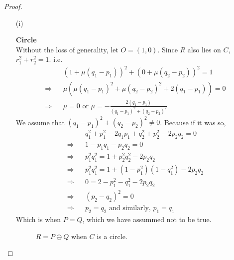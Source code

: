 \begin{proof}
  \begin{itemize}
    \item[(i)]{\textbf{Circle}\\
        Without the loss of generality, let $O=(1,0)$. Since $R$ also lies on $C$, $r_1^2+r_2^2=1$. i.e.
        \begin{eqnarray*}
          &&(1+\mu(q_1-p_1))^2+(0+\mu(q_2-p_2))^2=1\\
          \Rightarrow && \mu(\mu(q_1-p_1)^2+\mu(q_2-p_2)^2+2(q_1-p_1))=0\\
          \Rightarrow && \mu=0\text{ or }\mu=-\frac{2(q_1-p_1)}{(q_1-p_1)^2+(q_2-p_2)^2}
        \end{eqnarray*}
        We assume that $(q_1-p_1)^2+(q_2-p_2)^2\not=0$. Because if it was so,
        \begin{eqnarray*}
          &&q_1^2+p_1^2-2q_1p_1+q_2^2+p_2^2-2p_2q_2=0\\
          \Rightarrow&&1-p_1q_1-p_2q_2=0\\
          \Rightarrow&&p_1^2q_1^2=1+p_2^2q_2^2-2p_2q_2\\
          \Rightarrow&&p_1^2q_1^2=1+(1-p_1^2)(1-q_1^2)-2p_2q_2\\
          \Rightarrow&&0=2-p_1^2-q_1^2-2p_2q_2\\
          \Rightarrow&&(p_2-q_2)^2=0\\
          \Rightarrow&&p_2=q_2\text{ and similarly, }p_1=q_1
        \end{eqnarray*}
        Which is when $P=Q$, which we have assummed not to be true.

        \begin{figure}[H]
          \center
          \caption{$R = P \oplus Q$ when $C$ is a circle.}
        \end{figure}

}
\end{itemize}
\end{proof}
